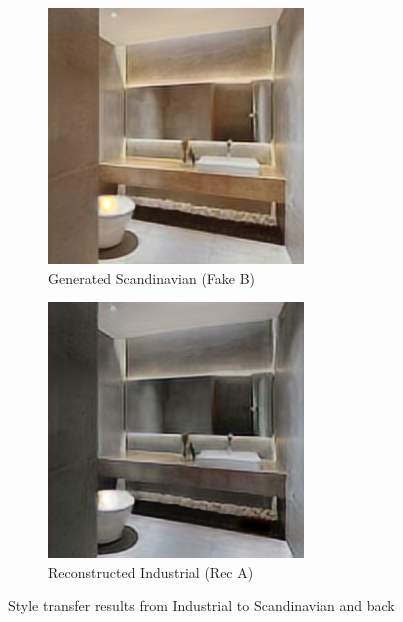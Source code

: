 \documentclass[twocolumn,superscriptaddress,aps]{revtex4-1}
\begin{document}
\begin{figure}[h]
\centering
\begin{subfigure}{0.2\textwidth}
    \includegraphics[width=\textwidth]{assets/fake_B.png}
    \caption{Generated Scandinavian (Fake B)}
    \label{fig:fake_scandinavian}
\end{subfigure}
\hfill
\begin{subfigure}{0.2\textwidth}
    \includegraphics[width=\textwidth]{assets/rec_A.png}
    \caption{Reconstructed Industrial (Rec A)}
    \label{fig:reconstructed_industrial}
\end{subfigure}
\caption{Style transfer results from Industrial to Scandinavian and back}
\label{fig:industrial_to_scandinavian_results}
\end{figure}
\end{document}
